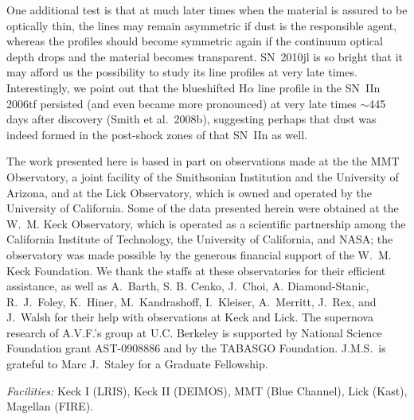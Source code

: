 \documentclass{emulateapj}
\begin{document}
One additional test is that at much later times when the material is
assured to be optically thin, the lines may remain asymmetric if dust
is the responsible agent, whereas the profiles should become
symmetric again if the continuum optical depth drops and the material
becomes transparent.  SN~2010jl is so bright that it may afford us the
possibility to study its line profiles at very late times.
Interestingly, we point out that the blueshifted H$\alpha$ line
profile in the SN~IIn 2006tf persisted (and even became more
pronounced) at very late times $\sim$445 days after discovery (Smith
et al.\ 2008b), suggesting perhaps that dust was indeed formed in the
post-shock zones of that SN~IIn as well.

\acknowledgments 
\footnotesize

The work presented here is based in part on observations made at the
the MMT Observatory, a joint facility of the Smithsonian Institution
and the University of Arizona, and at the Lick Observatory, which
is owned and operated by the University of California. 
Some of the data presented herein were
obtained at the W.~M. Keck Observatory, which is operated as a
scientific partnership among the California Institute of Technology,
the University of California, and NASA; the observatory was made
possible by the generous financial support of the W.~M. Keck
Foundation.  We thank the staffs at these observatories for their
efficient assistance, as well as A.\ Barth, S. B. Cenko, J.\ Choi,
A. Diamond-Stanic, R.~J.\ Foley, K.\ Hiner, M.\ Kandrashoff, I.\
Kleiser, A.\ Merritt, J.\ Rex, and J.\ Walsh for their help with
observations at Keck and Lick.  The supernova research of A.V.F.'s group
at U.C. Berkeley is supported by National Science Foundation grant
AST-0908886 and by the TABASGO Foundation. J.M.S.\ is grateful
to Marc J.\ Staley for a Graduate Fellowship.


{\it Facilities:} Keck I (LRIS), Keck II (DEIMOS),
MMT (Blue Channel), Lick (Kast), Magellan (FIRE).
\end{document}

